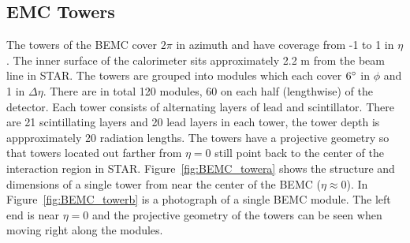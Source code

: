 \subsection{EMC Towers}

The towers of the BEMC cover $2\pi$ in azimuth and have coverage from -1 to 1 in $\eta$. The inner surface of the calorimeter sits approximately 2.2 m from the beam line in STAR. The towers are grouped into modules which each cover $6\degree$ in $\phi$ and 1 in $\Delta\eta$. There are in total 120 modules, 60 on each half (lengthwise) of the detector. Each tower consists of alternating layers of lead and scintillator. There are 21 scintillating layers and 20 lead layers in each tower, the tower depth is appproximately 20 radiation lengths. The towers have a projective geometry so that towers located out farther from $\eta = 0$ still point back to the center of the interaction region in STAR. Figure~\ref{fig:BEMC_towera} shows the structure and dimensions of a single tower from near the center of the BEMC ($\eta \approx 0$). In Figure~\ref{fig:BEMC_towerb} is a photograph of a single BEMC module. The left end is near $\eta = 0$ and the projective geometry of the towers can be seen when moving right along the modules.

